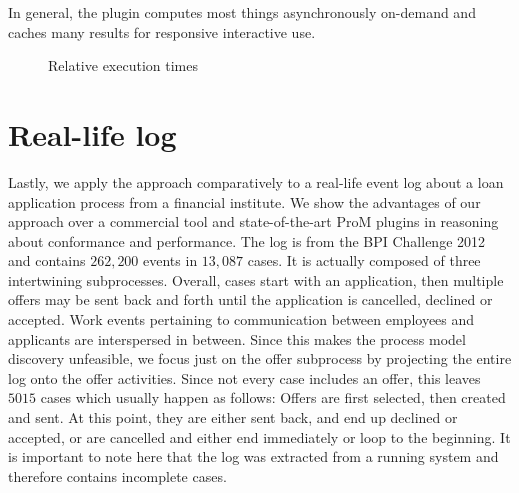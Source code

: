 In general, the plugin computes most things asynchronously on-demand and caches many results for responsive interactive use.
\begin{figure}[H]
    \centering
    \caption{Relative execution times}
    \label{fig:perfrel}
\end{figure}


\section{Real-life log}
Lastly, we apply the approach comparatively to a real-life event log about a loan application process from a financial institute. We show the advantages of our approach over a commercial tool and state-of-the-art ProM plugins in reasoning about conformance and performance.
The log is from the BPI Challenge 2012 \cite{bpi2012log} and contains $262,200$ events in $13,087$ cases. It is actually composed of three intertwining subprocesses. Overall, cases start with an application, then multiple offers may be sent back and forth until the application is cancelled, declined or accepted. Work events pertaining to communication between employees and applicants are interspersed in between. Since this makes the process model discovery unfeasible, we focus just on the offer subprocess by projecting the entire log onto the offer activities. Since not every case includes an offer, this leaves $5015$ cases which usually happen as follows: Offers are first selected, then created and sent. At this point, they are either sent back, and end up declined or accepted, or are cancelled and either end immediately or loop to the beginning. It is important to note here that the log was extracted from a running system and therefore contains incomplete cases.

